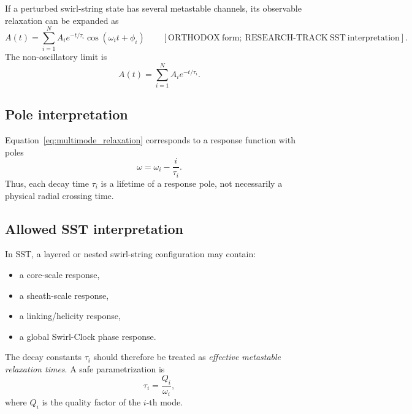         If a perturbed swirl-string state has several metastable channels, its observable relaxation can be expanded as
        \begin{equation}
            \boxed{
                A(t)
                =
                \sum_{i=1}^{N}
                A_i
                e^{-t/\tau_i}
                \cos(\omega_i t+\phi_i)
            }
            \qquad
            [\mathrm{ORTHODOX\ form;\ RESEARCH\text{-}TRACK\ SST\ interpretation}].
            \label{eq:multimode_relaxation}
        \end{equation}
        The non-oscillatory limit is
        \begin{equation}
            A(t)
            =
            \sum_{i=1}^{N}
            A_i e^{-t/\tau_i}.
            \label{eq:multigroup_decay}
        \end{equation}
    
    \subsection*{Pole interpretation}
        
        Equation~\eqref{eq:multimode_relaxation} corresponds to a response function with poles
        \begin{equation}
            \omega
            =
            \omega_i
            -
            \frac{i}{\tau_i}.
            \label{eq:response_poles}
        \end{equation}
        Thus, each decay time \(\tau_i\) is a lifetime of a response pole, not necessarily a physical radial crossing time.
    
    \subsection*{Allowed SST interpretation}
        
        In SST, a layered or nested swirl-string configuration may contain:
        \begin{itemize}
            \item a core-scale response,
            \item a sheath-scale response,
            \item a linking/helicity response,
            \item a global Swirl-Clock phase response.
        \end{itemize}
        The decay constants \(\tau_i\) should therefore be treated as \emph{effective metastable relaxation times}. A safe parametrization is
        \begin{equation}
            \tau_i
            =
            \frac{Q_i}{\omega_i},
            \label{eq:tau_Q_over_omega}
        \end{equation}
        where \(Q_i\) is the quality factor of the \(i\)-th mode.
    
